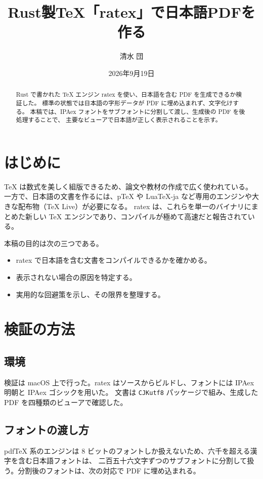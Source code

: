 \documentclass[11pt]{article}
\newcommand{\goth}[1]{#1}
\renewcommand{\today}{2026年9月19日}
\begin{document}
\title{\goth{Rust製TeX「ratex」で日本語PDFを作る}}
\author{\goth{清水 団}}
\date{\today}
\maketitle

\begin{abstract}
Rust で書かれた TeX エンジン ratex を使い、日本語を含む PDF を生成できるか検証した。
標準の状態では日本語の字形データが PDF に埋め込まれず、文字化けする。
本稿では、IPAex フォントをサブフォントに分割して渡し、生成後の PDF を後処理することで、
主要なビューアで日本語が正しく表示されることを示す。
\end{abstract}

\tableofcontents

\section{\goth{はじめに}}
TeX は数式を美しく組版できるため、論文や教材の作成で広く使われている。
一方で、日本語の文書を作るには、pTeX や LuaTeX-ja など専用のエンジンや大きな配布物（TeX Live）が必要になる。
ratex は、これらを単一のバイナリにまとめた新しい TeX エンジンであり、コンパイルが極めて高速だと報告されている。

本稿の目的は次の三つである。
\begin{itemize}
  \item ratex で日本語を含む文書をコンパイルできるかを確かめる。
  \item 表示されない場合の原因を特定する。
  \item 実用的な回避策を示し、その限界を整理する。
\end{itemize}

\section{\goth{検証の方法}}
\subsection{\goth{環境}}
検証は macOS 上で行った。ratex はソースからビルドし、フォントには IPAex 明朝と IPAex ゴシックを用いた。
文書は \texttt{CJKutf8} パッケージで組み、生成した PDF を四種類のビューアで確認した。

\subsection{\goth{フォントの渡し方}}
pdfTeX 系のエンジンは 8 ビットのフォントしか扱えないため、六千を超える漢字を含む日本語フォントは、
二百五十六文字ずつのサブフォントに分割して扱う。分割後のフォントは、次の対応で PDF に埋め込まれる。
\end{document}
